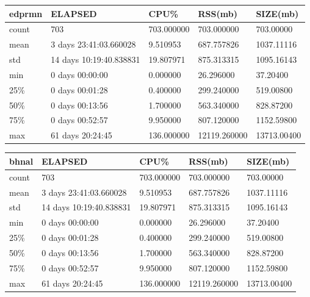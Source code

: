 \documentclass{article}
\begin{document}
\begin{tabular}{|l|l|l|l|l|}
\hline 
\hline edprmn&    ELAPSED&   CPU\%&   RSS(mb)&  SIZE(mb) \\
\hline count&   703& 703.000000&  703.000000&  703.00000 \\
\hline mean&  3 days 23:41:03.660028&  9.510953&  687.757826&  1037.11116 \\
\hline std&  14 days 10:19:40.838831&  19.807971&  875.313315&  1095.16143 \\
\hline min&   0 days 00:00:00&  0.000000&   26.296000&   37.20400 \\
\hline 25\%&   0 days 00:01:28&  0.400000&  299.240000&  519.00800 \\
\hline 50\%&   0 days 00:13:56&  1.700000&  563.340000&  828.87200 \\
\hline 75\%&   0 days 00:52:57&  9.950000&  807.120000&  1152.59800 \\
\hline max&   61 days 20:24:45& 136.000000& 12119.260000& 13713.00400 \\
\hline 
\end{tabular}
 
\begin{tabular}{|l|l|l|l|l|}
\hline 
\hline bhnal&    ELAPSED&   CPU\%&   RSS(mb)&  SIZE(mb) \\
\hline count&   703& 703.000000&  703.000000&  703.00000 \\
\hline mean&  3 days 23:41:03.660028&  9.510953&  687.757826&  1037.11116 \\
\hline std&  14 days 10:19:40.838831&  19.807971&  875.313315&  1095.16143 \\
\hline min&   0 days 00:00:00&  0.000000&   26.296000&   37.20400 \\
\hline 25\%&   0 days 00:01:28&  0.400000&  299.240000&  519.00800 \\
\hline 50\%&   0 days 00:13:56&  1.700000&  563.340000&  828.87200 \\
\hline 75\%&   0 days 00:52:57&  9.950000&  807.120000&  1152.59800 \\
\hline max&   61 days 20:24:45& 136.000000& 12119.260000& 13713.00400 \\
\hline 
\end{tabular}
 
\end{document}
